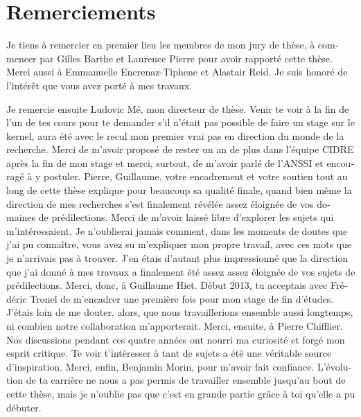 \chapter{Remerciements}

\begin{otherlanguage}{french}
  Je tiens à remercier en premier lieu les membres de mon jury de thèse, à
  commencer par Gilles Barthe et Laurence Pierre pour avoir rapporté cette
  thèse. Merci aussi à Emmanuelle Encrenaz-Tiphene et Alastair Reid. Je suis
  honoré de l’intérêt que vous avez porté à mes travaux.

  Je remercie ensuite Ludovic Mé, mon directeur de thèse. Venir te voir à la fin
  de l’un de tes cours pour te demander s’il n’était pas possible de faire un
  stage \og{}sur le kernel\fg{}, aura été avec le recul mon premier vrai pas en
  direction du monde de la recherche. Merci de m’avoir proposé de rester un an
  de plus dans l’équipe CIDRE après la fin de mon stage et merci, surtout, de
  m’avoir parlé de l’ANSSI et encouragé à y postuler.
  Pierre, Guillaume, votre encadrement et votre soutien tout au long de cette
  thèse explique pour beaucoup sa qualité finale, quand bien même la direction
  de mes recherches s’est finalement révélée assez éloignée de vos domaines de
  prédilections. Merci de m’avoir laissé libre d’explorer les sujets qui
  m’intéressaient. Je n’oublierai jamais comment, dans les moments de doutes que
  j'ai pu connaître, vous avez su m’expliquer mon propre travail, avec ces mots
  que je n'arrivais pas à trouver. J’en étais d’autant plus impressionné que la
  direction que j’ai donné à mes travaux a finalement été assez assez éloignée
  de vos sujets de prédilections.
  Merci, donc, à Guillaume Hiet. Début 2013, tu acceptais avec Frédéric Tronel
  de m’encadrer une première fois pour mon stage de fin d’études. J’étais loin
  de me douter, alors, que nous travaillerions ensemble aussi longtemps, ni
  combien notre collaboration m’apporterait.
  Merci, ensuite, à Pierre Chifflier. Nos discussions pendant ces quatre années
  ont nourri ma curiosité et forgé mon esprit critique. Te voir t’intéresser à
  tant de sujets a été une véritable source d’inspiration.
  Merci, enfin, Benjamin Morin, pour m'avoir fait confiance. L’évolution de ta
  carrière ne nous a pas permis de travailler ensemble jusqu’au bout de cette
  thèse, mais je n’oublie pas que c’est en grande partie grâce à toi qu’elle a
  pu débuter.


\end{otherlanguage}

